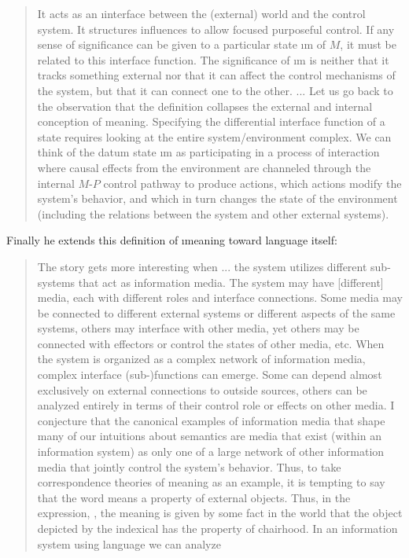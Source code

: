 {\begin{quote}
It acts as an \i{interface} between the (external) world
and the control system. It structures influences to allow
focused purposeful control. If any sense of significance
can be given to a particular state \i{m} of $M$, it must
be related to this interface function. The significance
of \i{m} is neither that it tracks something external nor
that it can affect the control mechanisms of the system,
but that it can connect one to the other. ... Let us go
back to the observation that the definition
collapses the external and internal conception of meaning.
Specifying the differential interface function of a
state requires looking at the entire system/environment
complex.  We can think of the datum state \i{m} as participating
in a process of interaction where causal effects
from the environment are channeled through the internal
$M$-$P$ control pathway to produce actions, which actions
modify the system's behavior, and which in turn
changes the state of the environment (including the relations
between the system and other external systems).
\cite[pp. 15-16]{OrlinVakarelov}
\end{quote}
Finally he extends this definition of \i{meaning}
toward language itself:
\begin{quote}The story gets more interesting when ...
the system utilizes different sub-systems that act
as information media.  The system may have [different] media, each
with different roles and interface connections.  Some media
may be connected to different external systems or
different aspects of the same systems, others may interface
with other media, yet others may be connected
with effectors or control the states of other media, etc.
When the system is organized as a complex network of
information media, complex interface (sub-)functions
can emerge. Some can depend almost exclusively on
external connections to outside sources, others can be
analyzed entirely in terms of their control role or effects
on other media. I conjecture that the canonical
examples of information media that shape many of our
intuitions about semantics are media that exist (within
an information system) as only one of a large network
of other information media that jointly control the system's
behavior. Thus, to take correspondence theories
of meaning as an example, it is tempting to say that
the word  means a property of external objects.
Thus, in the expression, , the meaning
is given by some fact in the world that the object depicted
by the indexical has the property of chairhood.
In an information system using language we can analyze

\end{quote}}
